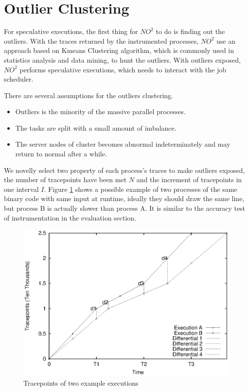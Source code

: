\section{Outlier Clustering}

For speculative executions, the first thing for $NO^2$ to do is finding out the outliers. With the traces returned by the instrumented processes, $NO^2$ use an approach based on Kmeans Clustering algorithm, which is commonly used in statistics analysis and data mining, to hunt the outliers. With outliers exposed, $NO^2$ performs speculative executions, which needs to interact with the job scheduler.

There are several assumptions for the outliers clustering.

\begin{itemize}
\item Outliers is the minority of the massive parallel processes.
\item The tasks are split with a small amount of imbalance.
\item The server nodes of cluster becomes abnormal indeterminately and may return to normal after a while.
\end{itemize}

We novelly select two property of each process's traces to make outliers exposed, the number of tracepoints have been met $N$ and the increment of tracepoints in one interval $I$. Figure \ref{figure:executionsexample} shows a possible example of two processes of the same binary code with same input at runtime, ideally they should draw the same line, but process B is actually slower than process A. It is similar to the accuracy test of instrumentation in the evaluation section.

\begin{figure}
\centering
\includegraphics[width=0.9\columnwidth]{figures/executions_example.eps}
\caption{Tracepoints of two example executions}
\label{figure:executionsexample}
\end{figure}

